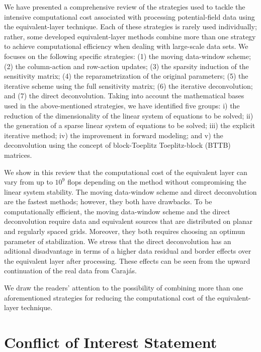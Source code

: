 \documentclass[utf8]{FrontiersinHarvard} %
\begin{document}
	We have presented a comprehensive review of the strategies used to tackle the intensive computational cost associated with processing potential-field data using the equivalent-layer technique. 
	Each of these strategies is rarely used  individually; rather, some 
	developed equivalent-layer methods combine more than one strategy to achieve computational efficiency when dealing with large-scale data sets.
	We focuses on  the following specific strategies: 
	(1) the moving data-window scheme;
	(2) the column-action and row-action updates;
	(3) the sparsity induction of the sensitivity matrix;
	(4) the reparametrization of the original parameters;
	(5) the iterative scheme using the full sensitivity matrix;
	(6) the iterative deconvolution; and
	(7) the direct deconvolution.
	Taking into account the mathematical bases used in the above-mentioned strategies, we have identified five groups:
	i) the reduction of the dimensionality of the linear system of equations to be solved;
	ii) the generation of a sparse linear system of equations to be solved;
	iii) the explicit iterative method;
	iv) the improvement in forward modeling; and
	v) the deconvolution using the concept of block-Toeplitz Toeplitz-block (BTTB) matrices.
	
	We show in this review that the computational cost of the equivalent layer can vary from up to $10^{9}$ flops depending on the method without compromising the linear system stability. 
	The moving data-window scheme and direct deconvolution are the fastest methods; however, they both have drawbacks.
	To be computationally efficient, the moving data-window scheme and 
	the direct deconvolution require data and equivalent sources that are distributed on planar and regularly spaced grids.
	Moreover, they both requires choosing an optimun parameter of stabilization. 
	We stress that the direct deconvolution has an aditional disadvantage in terms of a higher data residual and border effects over the equivalent layer after processing.
	These effects can be seen from the upward continuation of the real data from Carajás.
	
	We draw the readers' attention to the possibility of combining more than one aforementioned strategies for reducing the computational cost of the equivalent-layer technique.
	
	
	\section*{Conflict of Interest Statement}
	
\end{document}
